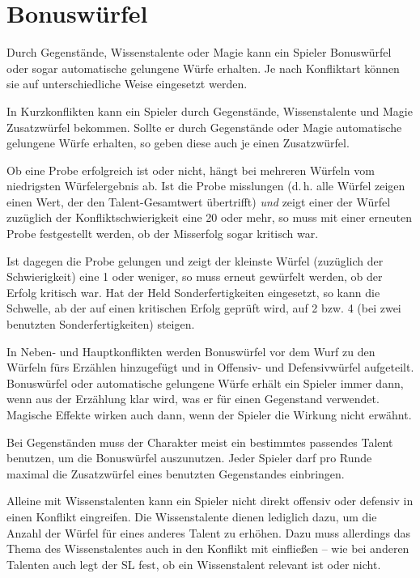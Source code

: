\section{Bonuswürfel}\label{Bonuswuerfel}
Durch Gegenstände, Wissenstalente oder Magie kann ein Spieler Bonuswürfel oder sogar automatische gelungene Würfe erhalten. Je nach Konfliktart können sie auf unterschiedliche Weise eingesetzt werden.

In Kurzkonflikten kann ein Spieler durch Gegenstände, Wissenstalente und Magie Zusatzwürfel bekommen. Sollte er durch Gegenstände oder Magie automatische gelungene Würfe erhalten, so geben diese auch je einen Zusatzwürfel.

Ob eine Probe erfolgreich ist oder nicht, hängt bei mehreren Würfeln vom niedrigsten Würfelergebnis ab. Ist die Probe misslungen (d.\,h. alle Würfel zeigen einen Wert, der den Talent-Gesamtwert übertrifft) \emph{und} zeigt einer der Würfel zuzüglich der Konfliktschwierigkeit eine 20 oder mehr, so muss mit einer erneuten Probe festgestellt werden, ob der Misserfolg sogar kritisch war.

Ist dagegen die Probe gelungen und zeigt der kleinste Würfel (zuzüglich der Schwierigkeit) eine 1 oder weniger, so muss erneut gewürfelt werden, ob der Erfolg kritisch war. 
Hat der Held Sonderfertigkeiten eingesetzt, so kann die Schwelle, ab der auf einen kritischen Erfolg geprüft wird, auf 2 bzw. 4 (bei zwei benutzten Sonderfertigkeiten) steigen.

\medskip

In Neben- und Hauptkonflikten werden Bonuswürfel vor dem Wurf zu den Würfeln fürs Erzählen hinzugefügt und in Offensiv- und Defensivwürfel aufgeteilt. Bonuswürfel oder automatische gelungene Würfe erhält ein Spieler immer dann, wenn aus der Erzählung klar wird, was er für einen Gegenstand verwendet. Magische Effekte wirken auch dann, wenn der Spieler die Wirkung nicht erwähnt.

Bei Gegenständen muss der Charakter meist ein bestimmtes passendes Talent benutzen, um die Bonuswürfel auszunutzen. Jeder Spieler darf pro Runde maximal die Zusatzwürfel eines benutzten Gegenstandes einbringen.

Alleine mit Wissenstalenten kann ein Spieler nicht direkt offensiv oder defensiv in einen Konflikt eingreifen. Die Wissenstalente dienen lediglich dazu, um die Anzahl der Würfel für eines anderes Talent zu erhöhen. Dazu muss allerdings das Thema des Wissenstalentes auch in den Konflikt mit einfließen -- wie bei anderen Talenten auch legt der SL fest, ob ein Wissenstalent relevant ist oder nicht.

